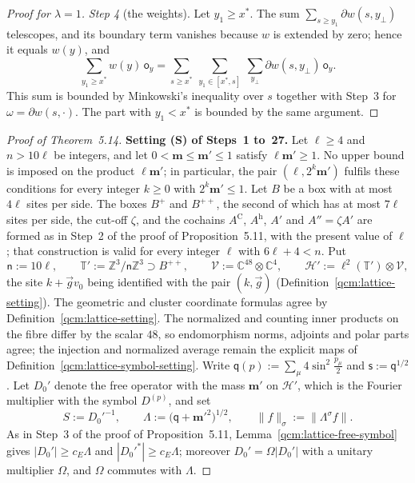 \documentclass[11pt,letterpaper,reqno]{amsart}
\theoremstyle{definition}
\begin{document}
\begin{proof}[Proof for $\lambda=1$]
\emph{Step 4} (the weights).
Let $y_1\ge x^*$.
The sum $\sum_{s\ge y_1}\partial w(s,y_\perp)$ telescopes, and its boundary term vanishes because $w$ is extended by zero;
hence it equals $w(y)$, and
\begin{equation*}
\sum_{y_1\ge x^*}w(y)\,\mathsf o_y=\sum_{s\ge x^*}\ \sum_{y_1\in[x^*,s]}\ \sum_{y_\perp}\partial w(s,y_\perp)\,\mathsf o_y.
\end{equation*}
This sum is bounded by Minkowski's inequality over $s$ together with Step~3 for $\omega=\partial w(s,\cdot)$.
The part with $y_1<x^*$ is bounded by the same argument.
\end{proof}

\begin{proof}[Proof of Theorem~5.14]
\textbf{Setting (S) of Steps~1 to~27.}
Let $\ell\ge4$ and $n>10\ell$ be integers, and let $0<\mathbf m\le\mathbf m'\le1$ satisfy $\ell\mathbf m'\ge1$.
No upper bound is imposed on the product $\ell\mathbf m'$;
in particular, the pair $(\ell,2^k\mathbf m')$ fulfils these conditions for every integer $k\ge0$ with $2^k\mathbf m'\le1$.
Let $B$ be a box with at most $4\ell$ sites per side.
The boxes $B^+$ and $B^{++}$, the second of which has at most $7\ell$ sites per side, the cut-off $\zeta$, and the cochains $A^{\mathrm C}$, $A^{\mathrm h}$, $A'$ and $A''=\zeta A'$ are formed as in Step~2 of the proof of Proposition~5.11, with the present value of $\ell$;
that construction is valid for every integer $\ell$ with $6\ell+4<n$.
Put
\begin{equation*}
\mathsf n:=10\ell,\qquad\mathbb T':=\mathbb Z^3/\mathsf n\mathbb Z^3\supset B^{++},\qquad\mathcal V:=\mathbb C^{48}\otimes\mathbb C^4,\qquad\mathcal H':=\ell^2(\mathbb T')\otimes\mathcal V,
\end{equation*}
the site $k+\vec gv_0$ being identified with the pair $(k,\vec g)$ (Definition~\ref{qcm:lattice-setting}).
The geometric and cluster coordinate formulas agree by Definition~\ref{qcm:lattice-setting}. The normalized and counting inner products on the fibre differ by the scalar $48$, so endomorphism norms, adjoints and polar parts agree; the injection and normalized average remain the explicit maps of Definition~\ref{qcm:lattice-symbol-setting}.
Write $\mathsf q(p):=\sum_\mu4\sin^2\frac{p_\mu}{2}$ and $\mathsf s:=\mathsf q^{1/2}$.
Let $D_0'$ denote the free operator with the mass $\mathbf m'$ on $\mathcal H'$, which is the Fourier multiplier with the symbol $D^{(p)}$, and set
\begin{equation*}
S:=D_0'^{-1},\qquad\Lambda:=\bigl(\mathsf q+\mathbf m'^2\bigr)^{1/2},\qquad\|f\|_\sigma:=\|\Lambda^\sigma f\|.
\end{equation*}
As in Step~3 of the proof of Proposition~5.11, Lemma~\ref{qcm:lattice-free-symbol} gives $|D_0'|\ge c_E\Lambda$ and $|D_0'^*|\ge c_E\Lambda$;
moreover $D_0'=\Omega|D_0'|$ with a unitary multiplier $\Omega$, and $\Omega$ commutes with $\Lambda$.


\end{proof}
\end{document}
